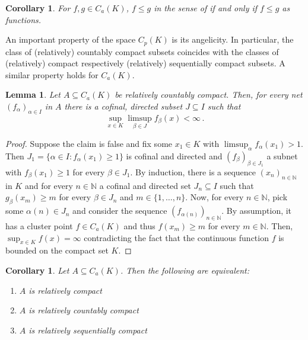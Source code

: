 \documentclass[
	paper=A4,
	pagesize=auto,
	fontsize=12pt
]{scrartcl}
\theoremstyle{plain}
\newtheorem{lemma}[theorem]{Lemma}
\newtheorem{corollary}[theorem]{Corollary}
\theoremstyle{remark}
\theoremstyle{definition}
\begin{document}
%
\begin{corollary}
\label{cor:SpecialisationOrderInCaKCoincidesWithFunctionOrder}
For $f, g \in C_a(K)$, $f \le g$ in the sense of  if and only if $f \le g$ as functions.
\end{corollary}
%
An important property of the space $C_p(K)$ is its angelicity.
In particular, the class of (relatively) countably compact subsets coincides with the classes of (relatively) compact respectively (relatively) sequentially compact subsets.
A similar property holds for $C_a(K)$.
%
\begin{lemma}
\label{lem:CaKRelativelyCountablyCompactSubnetBounded}
Let $A \subseteq C_a(K)$ be relatively countably compact.
Then, for every net $(f_\alpha)_{\alpha \in I}$ in $A$ there is a cofinal, directed subset $J \subseteq I$  such that
%
\begin{equation}
\sup_{x \in K} \limsup_{\beta \in J} f_\beta \left( x \right) < \infty \, .
\end{equation}
\end{lemma}
\begin{proof}
Suppose the claim is false and fix some $x_1 \in K$ with $\limsup_\alpha f_\alpha(x_1) > 1$.
Then $J_1 = \{ \alpha \in I : f_\alpha(x_1) \ge 1 \}$ is cofinal and directed and $(f_\beta)_{\beta \in J_1}$ a subnet with $f_\beta(x_1) \ge 1$ for every $\beta \in J_1$.
By induction, there is a sequence $(x_n)_{n \in \mathbb{N}}$ in $K$ and for every $n \in \mathbb{N}$ a cofinal and directed set $J_n \subseteq I$ such that $g_\beta(x_m) \ge m$ for every $\beta \in J_n$ and $m \in \{ 1, \dots, n \}$.
Now, for every $n \in \mathbb{N}$, pick some $\alpha(n) \in J_n$ and consider the sequence $(f_{\alpha(n)})_{n \in \mathbb{N}}$.
By assumption, it has a cluster point $f \in C_a(K)$ and thus $f( x_m ) \ge m$ for every $m \in \mathbb{N}$.
Then, $\sup_{x \in K} f(x) = \infty$ contradicting the fact that the continuous function $f$ is bounded on the compact set $K$.
\end{proof}
%
\begin{corollary}
\label{cor:RelativeCompactnessEquivalences}
Let $A \subseteq C_a(K)$.
Then the following are equivalent:
%
\begin{enumerate}
\item $A$ is relatively compact
\item $A$ is relatively countably compact
\item $A$ is relatively sequentially compact
\end{enumerate}
\end{corollary}
\end{document}
